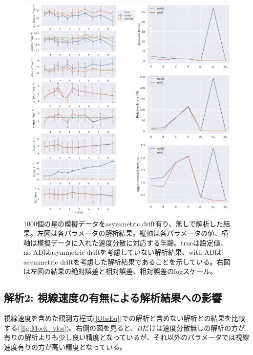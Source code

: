 \begin{figure}[htbp]
	\centering
	\includegraphics[width=15cm]{fig/Mock_AD.pdf}
	\caption{1000個の星の模擬データをasymmetric drift有り、無しで解析した結果。左図は各パラメータの解析結果。縦軸は各パラメータの値、横軸は模擬データに入れた速度分散に対応する年齢。trueは設定値、no ADはasymmetric driftを考慮していない解析結果、with ADはasymmetric driftを考慮した解析結果であることを示している。右図は左図の結果の絶対誤差と相対誤差、相対誤差のlogスケール。} \label{fig:Mock_AD}
\end{figure}


\subsection{解析2: 視線速度の有無による解析結果への影響}
視線速度を含めた観測方程式(\ref{ObsEq})での解析と含めない解析との結果を比較する(\ref{fig:Mock_vlos})。右側の図を見ると、$B$だけは速度分散無しの解析の方が有りの解析よりも少し良い精度となっているが、それ以外のパラメータでは視線速度有りの方が高い精度となっている。

